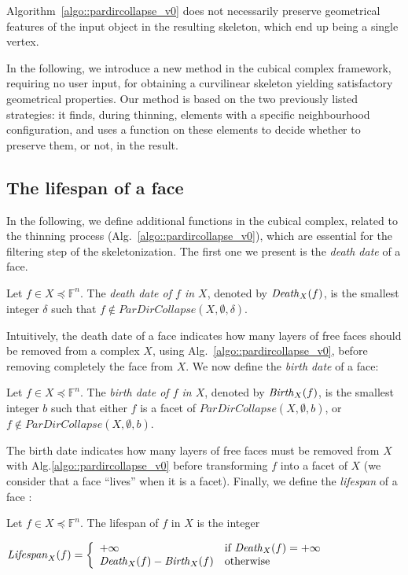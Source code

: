 \documentclass[final,envcountsame]{llncs}
\def\myem#1{{\em #1}}
\def\quotes#1{``#1''}
\def\birth#1#2{\mbox{\it{}Birth\/}_{#2}(#1)}
\def\death#1#2{\mbox{\it{}Death\/}_{#2}(#1)}
\def\lifespan#1#2{\mbox{\it{}Lifespan\/}_{#2}(#1)}
\def\allfaces#1{\mathbb{F}^{#1}}
\def\subcomplex#1#2{#1 \preceq #2}
\def\complex#1#2{\subcomplex{#2}{\allfaces{#1}}}
\begin{document}
Algorithm~\ref{algo::pardircollapse_v0} does not necessarily preserve geometrical features of the input object in the resulting skeleton, which end up being a single vertex.

In the following, we introduce a new method in the cubical complex framework, requiring no user input, for obtaining a curvilinear skeleton yielding satisfactory geometrical properties. Our method is based on the two previously listed strategies: it finds, during thinning, elements with a specific neighbourhood configuration, and uses a function on these elements to decide whether to preserve them, or not, in the result.

\subsection{The lifespan of a face}
In the following, we define additional functions in the cubical complex, related to the thinning process (Alg.~\ref{algo::pardircollapse_v0}), which are essential for the filtering step of the skeletonization. The first one we present is the \myem{death date} of a face.

\begin{definition}
Let $f \in \complex{n}{X}$. The \myem{death date of $f$ in $X$}, denoted by $\death{f}{X}$, is the smallest integer $\delta$ such that $f \notin ParDirCollapse(X, \emptyset, \delta)$. 
\end{definition}

Intuitively, the death date of a face indicates how many layers of free faces should be removed from a complex $X$, using Alg.~\ref{algo::pardircollapse_v0}, before removing completely the face from $X$. We now define the \myem{birth date} of a face:

\begin{definition}
Let $f \in \complex{n}{X}$. The \myem{birth date of $f$ in $X$}, denoted by $\birth{f}{X}$, is the smallest integer $b$ such that either $f$ is a facet of $ParDirCollapse(X, \emptyset, b)$, or $f \notin ParDirCollapse(X, \emptyset, b)$.
\end{definition}

The birth date indicates how many layers of free faces must be removed from $X$ with Alg.\ref{algo::pardircollapse_v0} before transforming $f$ into a facet of $X$ (we consider that a face \quotes{lives} when it is a facet).
Finally, we define the \myem{lifespan} of a face :

\begin{definition}
Let $f \in \complex{n}{X}$. The lifespan of $f$ in $X$ is the integer 

\begin{math}
\lifespan{f}{X} = \left\{
\begin{array}{ll}
+\infty & \text{if $\death{f}{X}=+\infty$}\\
\death{f}{X} - \birth{f}{X} & \text{otherwise}
\end{array}
\right.
\end{math}
\end{definition}
\end{document}
